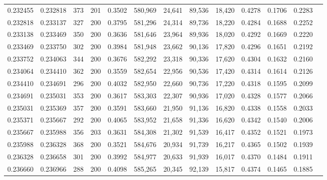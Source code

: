 \begin{tabular}{rrrrrrrrrrrrr}
0.232455 & 0.232818 &    373 & 201 &                                     0.3502 & 580,969 &  24,641 &  89,536 &  18,420 & 0.4278 & 0.1706 & 0.2283 \\
0.232818 & 0.233137 &    327 & 200 &                                     0.3795 & 581,296 &  24,314 &  89,736 &  18,220 & 0.4284 & 0.1688 & 0.2252 \\
0.233138 & 0.233469 &    350 & 200 &                                     0.3636 & 581,646 &  23,964 &  89,936 &  18,020 & 0.4292 & 0.1669 & 0.2220 \\
0.233469 & 0.233750 &    302 & 200 &                                     0.3984 & 581,948 &  23,662 &  90,136 &  17,820 & 0.4296 & 0.1651 & 0.2192 \\
0.233752 & 0.234063 &    344 & 200 &                                     0.3676 & 582,292 &  23,318 &  90,336 &  17,620 & 0.4304 & 0.1632 & 0.2160 \\
0.234064 & 0.234410 &    362 & 200 &                                     0.3559 & 582,654 &  22,956 &  90,536 &  17,420 & 0.4314 & 0.1614 & 0.2126 \\
0.234410 & 0.234691 &    296 & 200 &                                     0.4032 & 582,950 &  22,660 &  90,736 &  17,220 & 0.4318 & 0.1595 & 0.2099 \\
0.234691 & 0.235031 &    353 & 200 &                                     0.3617 & 583,303 &  22,307 &  90,936 &  17,020 & 0.4328 & 0.1577 & 0.2066 \\
0.235031 & 0.235369 &    357 & 200 &                                     0.3591 & 583,660 &  21,950 &  91,136 &  16,820 & 0.4338 & 0.1558 & 0.2033 \\
0.235371 & 0.235667 &    292 & 200 &                                     0.4065 & 583,952 &  21,658 &  91,336 &  16,620 & 0.4342 & 0.1540 & 0.2006 \\
0.235667 & 0.235988 &    356 & 203 &                                     0.3631 & 584,308 &  21,302 &  91,539 &  16,417 & 0.4352 & 0.1521 & 0.1973 \\
0.235988 & 0.236328 &    368 & 200 &                                     0.3521 & 584,676 &  20,934 &  91,739 &  16,217 & 0.4365 & 0.1502 & 0.1939 \\
0.236328 & 0.236658 &    301 & 200 &                                     0.3992 & 584,977 &  20,633 &  91,939 &  16,017 & 0.4370 & 0.1484 & 0.1911 \\
0.236660 & 0.236966 &    288 & 200 &                                     0.4098 & 585,265 &  20,345 &  92,139 &  15,817 & 0.4374 & 0.1465 & 0.1885 \\

\end{tabular}
